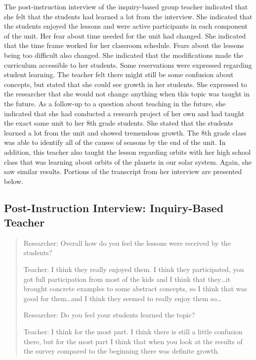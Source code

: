 \documentclass[11.5pt]{sig-alternate} %
\begin{document}
\begin{large}
The post-instruction interview of the inquiry-based group teacher indicated that she felt that the students had learned a lot from the interview.  She indicated that the students enjoyed the lessons and were active participants in each component of the unit.  Her fear about time needed for the unit had changed.  She indicated that the time frame worked for her classroom schedule.  Fears about the lessons being too difficult also changed.  She indicated that the modifications made the curriculum accessible to her students.  Some reservations were expressed regarding student learning.  The teacher felt there might still be some confusion about concepts, but stated that she could see growth in her students.  She expressed to the researcher that she would not change anything when this topic was taught in the future. As a follow-up to a question about teaching in the future, she indicated that she had conducted a research project of her own and had taught the exact same unit to her 8th grade students.  She stated that the students learned a lot from the unit and showed tremendous growth.   The 8th grade class was able to identify all of the causes of seasons by the end of the unit.  In addition, this teacher also taught the lesson regarding orbits with her high school class that was learning about orbits of the planets in our solar system. Again, she saw similar results.   Portions of the transcript from her interview are presented below.

\subsection*{Post-Instruction Interview: Inquiry-Based Teacher}

\begin{quote}
Researcher:  Overall how do you feel the lessons were received by the students?

Teacher:  I think they really enjoyed them.  I think they participated, you got full participation from most of the kids and I think that they…it brought concrete examples to some abstract concepts, so I think that was good for them…and I think they seemed to really enjoy them so…

Researcher:  Do you feel your students learned the topic?

Teacher:  I think for the most part.  I think there is still a little confusion there, but for the most part I think that when you look at the results of the survey compared to the beginning there was definite growth.  


\end{quote}
\end{large}
\end{document}
